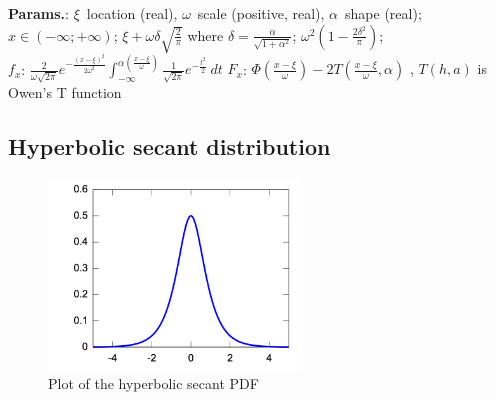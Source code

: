     {\color{darkblue} \textbf{Params.}:} {$\xi \,$ location (real),  $\omega \,$ scale (positive, real),  $\alpha \,$ shape (real)}; {$x \in (-\infty; +\infty)\!$}; {$\xi + \omega\delta\sqrt{\frac{2}{\pi}}$ where $\delta = \frac{\alpha}{\sqrt{1+\alpha^2}}$}; {$\omega^2\left(1 - \frac{2\delta^2}{\pi}\right)$};\hspace{0.5cm}\\{\color{darkblue} \textbf{$f_x$}:} {$\frac{2}{\omega \sqrt{2 \pi}} e^{-\frac{(x-\xi)^2}{2\omega^2}} \int_{-\infty}^{\alpha\left(\frac{x-\xi}{\omega}\right)} \frac{1}{\sqrt{2 \pi}}  e^{-\frac{t^2}{2}}\ dt$}{\color{darkblue} \textbf{$F_x$}:} {$\Phi\left(\frac{x-\xi}{\omega}\right)-2T\left(\frac{x-\xi}{\omega},\alpha\right)$ ,  $T(h,a)$ is Owen's T function}



    
        
\subsection{Hyperbolic secant distribution}


    \begin{figure}[H]
        \centering
        \includegraphics[width=0.6\textwidth]{images/Hyper_secant_pdf.png}
        \caption{Plot of the hyperbolic secant PDF}
    \end{figure}




